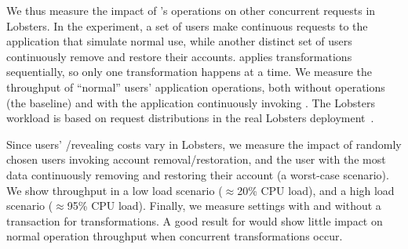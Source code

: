 %
We thus measure the impact of \sys's operations on other concurrent requests
in Lobsters.
%
In the experiment, a set of users make continuous requests to the
application that simulate normal use, while another distinct set of users
continuously remove and restore their accounts.
%
\sys applies \xxing transformations sequentially, so only one transformation
happens at a time.
%
%
We measure the throughput of ``normal'' users' application operations, both
without \sys operations (the baseline) and with the application continuously
invoking \sys.
%
The Lobsters workload is based on request distributions in the real
Lobsters deployment~\cite{lobsters-data}.
%

%
Since users' \xxing/revealing costs vary in Lobsters, we measure the
impact of \one{} randomly chosen users invoking account removal/restoration, and
\two{} the user with the most data continuously removing and restoring their
account (a worst-case scenario).
%
We show throughput in a low load scenario ($\approx$20\% CPU load),
and a high load scenario ($\approx$95\% CPU load).
%
Finally, we measure settings with and without a transaction for \sys
transformations.
%
%
A good result for \sys would show little impact on normal operation throughput
when concurrent \xxing transformations occur.
%

